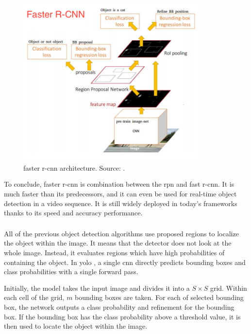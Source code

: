             \begin{figure}[ht]
                \centering
                \includegraphics[width=0.85\textwidth]{resources/faster_r_cnn_architecture.png}
                \caption{\Gls{faster r-cnn} architecture. Source: \cite{xuobjectdetection}.}
                \label{fig:faster r-cnn architecture}
            \end{figure}
            
            To conclude, \gls{faster r-cnn} is combination between the \gls{rpn} and \gls{fast r-cnn}. It is much faster than its predecessors, and it can even be used for real-time object detection in a video sequence. It is still widely deployed in today's frameworks thanks to its speed and accuracy performance.
            
        \subsubsection{}
            All of the previous object detection algorithms use proposed regions to localize the object within the image. It means that the detector does not look at the whole image. Instead, it evaluates regions which have high probabilities of containing the object. In \gls{yolo} \cite{redmon2016you}, a single \gls{cnn} directly predicts bounding boxes and class probabilities with a single forward pass.
            
            Initially, the model takes the input image and divides it into a $S \times S$ grid. Within each cell of the grid, $m$ bounding boxes are taken. For each of selected bounding box, the network outputs a class probability and refinement for the bounding box. If the bounding box has the class probability above a threshold value, it is then used to locate the object within the image. 
            
